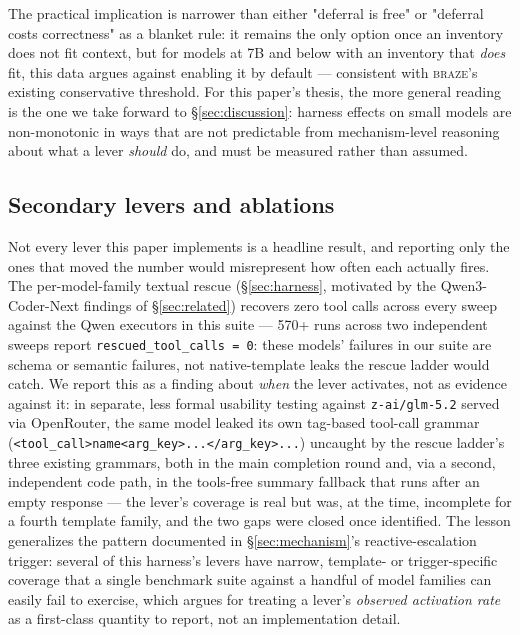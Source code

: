\documentclass[smallcondensed,natbib]{svjour3}
\newcommand{\braze}{\textsc{braze}}
\begin{document}
The practical implication is narrower than either "deferral is free" or
"deferral costs correctness" as a blanket rule: it remains the only
option once an inventory does not fit context, but for models at 7B and
below with an inventory that \emph{does} fit, this data argues against
enabling it by default --- consistent with \braze{}'s existing
conservative threshold. For this paper's thesis, the more general
reading is the one we take forward to \S\ref{sec:discussion}: harness
effects on small models are non-monotonic in ways that are not
predictable from mechanism-level reasoning about what a lever
\emph{should} do, and must be measured rather than assumed.

\subsection{Secondary levers and ablations}\label{sec:ablations}

Not every lever this paper implements is a headline result, and
reporting only the ones that moved the number would misrepresent how
often each actually fires. The per-model-family textual rescue
(\S\ref{sec:harness}, motivated by the Qwen3-Coder-Next findings of
\S\ref{sec:related}) recovers zero tool calls across every sweep against
the Qwen executors in this suite --- 570+ runs across two independent
sweeps report \texttt{rescued\_tool\_calls = 0}: these models' failures
in our suite are schema or semantic failures, not native-template leaks
the rescue ladder would catch. We report this as a finding about
\emph{when} the lever activates, not as evidence against it: in
separate, less formal usability testing against \texttt{z-ai/glm-5.2}
served via OpenRouter, the same model leaked its own tag-based tool-call
grammar (\texttt{<tool\_call>name<arg\_key>...</arg\_key>...}) uncaught
by the rescue ladder's three existing grammars, both in the main
completion round and, via a second, independent code path, in the
tools-free summary fallback that runs after an empty response --- the
lever's coverage is real but was, at the time, incomplete for a fourth
template family, and the two gaps were closed once identified. The
lesson generalizes the pattern documented in
\S\ref{sec:mechanism}'s reactive-escalation trigger: several of this
harness's levers have narrow, template- or trigger-specific coverage
that a single benchmark suite against a handful of model families can
easily fail to exercise, which argues for treating a lever's
\emph{observed activation rate} as a first-class quantity to report,
not an implementation detail.
\end{document}
